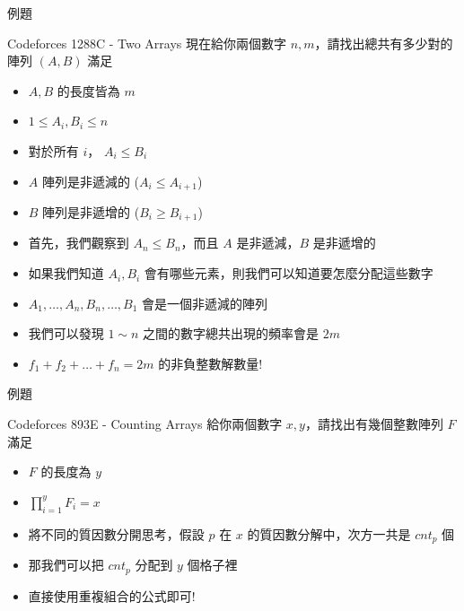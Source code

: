 \documentclass[aspectratio=169]{beamer}
\begin{document}
\begin{frame}{例題}
    \begin{block}{Codeforces 1288C - Two Arrays}
        現在給你兩個數字 $n,m$，請找出總共有多少對的陣列 $(A,B)$ 滿足
        \begin{itemize}
            \item $A,B$ 的長度皆為 $m$
            \item $1 \le A_i, B_i \le n$
            \item 對於所有 $i$， $A_i \le B_i$
            \item $A$ 陣列是非遞減的 ($A_i \le A_{i+1}$)
            \item $B$ 陣列是非遞增的 ($B_i \ge B_{i+1}$)
        \end{itemize}
    \end{block} \pause
    \begin{itemize}
        \item<1-> 首先，我們觀察到 $A_n \le B_n$，而且 $A$ 是非遞減，$B$ 是非遞增的
        \item<2-> 如果我們知道 $A_i, B_i$ 會有哪些元素，則我們可以知道要怎麼分配這些數字
        \item<3-> $A_1,\dots,A_n,B_n,\dots,B_1$ 會是一個非遞減的陣列
        \item<4-> 我們可以發現 $1 \sim n$ 之間的數字總共出現的頻率會是 $2m$
        \item<5-> $f_1 + f_2 + \dots + f_n = 2m$ 的非負整數解數量!
    \end{itemize}
\end{frame}

\begin{frame}{例題}
    \begin{block}{Codeforces 893E - Counting Arrays}
        給你兩個數字 $x,y$，請找出有幾個整數陣列 $F$ 滿足
        \begin{itemize}
            \item $F$ 的長度為 $y$
            \item $\prod^y_{i=1} F_i = x$
        \end{itemize}
    \end{block} \pause
    \begin{itemize}
        \item 將不同的質因數分開思考，假設 $p$ 在 $x$ 的質因數分解中，次方一共是 $cnt_p$ 個
        \item 那我們可以把 $cnt_p$ 分配到 $y$ 個格子裡
        \item 直接使用重複組合的公式即可!
    \end{itemize}
\end{frame}
\end{document}
